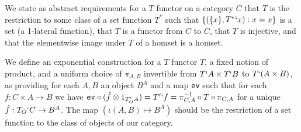 \documentclass[12pt]{article}
\begin{document}
We state as abstract requirements for a $T$ functor on a category $C$ that $T$ is the restriction to some class of a set function $T^*$ such that $\{(\{x\},T^*`x):x=x\}$ is a set (a 1-lateral function), that $T$ is a functor from $C$ to $C$, that $T$ is injective, and that the elementwise image under $T$ of a homset is a homset.

We define an exponential construction for a $T$ functor $T$, a fixed notion of product, and a uniform choice of $\pi_{A,B}$ invertible from $T`A \times T`B$ to $T`(A \times B)$, as providing for each $A,B$ an object $B^A$ and a map {\tt ev} such that 
 for each $f:C \times A \rightarrow B$ we have ${\tt ev}\circ (\hat f \otimes 1_{T_O'A}) = T'`f = \pi_{C,A}^{-1}\circ T \circ \pi_{C,A}$ for a unique $\hat f:T_O`C \rightarrow B^A$.  The map $(\iota(A,B) \mapsto B^A)$ should be the restriction of a set function to the class of objects of our category.
\end{document}
